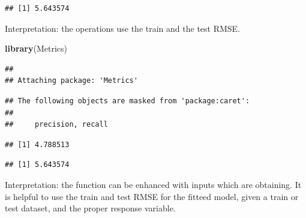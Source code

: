 \documentclass[]{report}
\newenvironment{Shaded}{\begin{snugshade}}{\end{snugshade}}
\newcommand{\KeywordTok}[1]{\textcolor[rgb]{0.13,0.29,0.53}{\textbf{#1}}}
\newcommand{\DataTypeTok}[1]{\textcolor[rgb]{0.13,0.29,0.53}{#1}}
\newcommand{\DecValTok}[1]{\textcolor[rgb]{0.00,0.00,0.81}{#1}}
\newcommand{\CommentTok}[1]{\textcolor[rgb]{0.56,0.35,0.01}{\textit{#1}}}
\newcommand{\OperatorTok}[1]{\textcolor[rgb]{0.81,0.36,0.00}{\textbf{#1}}}
\newcommand{\NormalTok}[1]{#1}
\begin{document}
\begin{verbatim}
## [1] 5.643574
\end{verbatim}

Interpretation: the operations use the train and the test RMSE.

\begin{Shaded}
\begin{Highlighting}[]
\KeywordTok{library}\NormalTok{(Metrics)}
\end{Highlighting}
\end{Shaded}

\begin{verbatim}
## 
## Attaching package: 'Metrics'
\end{verbatim}

\begin{verbatim}
## The following objects are masked from 'package:caret':
## 
##     precision, recall
\end{verbatim}

\begin{Shaded}
\end{Shaded}

\begin{verbatim}
## [1] 4.788513
\end{verbatim}

\begin{Shaded}
\end{Shaded}

\begin{verbatim}
## [1] 5.643574
\end{verbatim}

Interpretation: the function can be enhanced with inputs which are
obtaining. It is helpful to use the train and test RMSE for the fitteed
model, given a train or test dataset, and the proper response variable.
\end{document}
